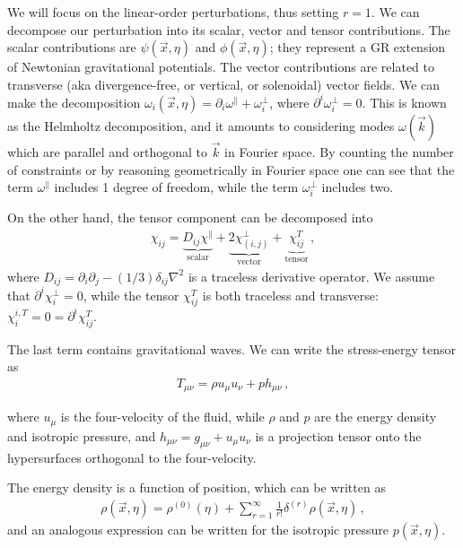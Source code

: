 \documentclass[main.tex]{subfiles}
\begin{document}

We will focus on the linear-order perturbations, thus setting \(r = 1\).
We can decompose our perturbation into its scalar, vector and tensor contributions. 
The scalar contributions are \(\psi (\vec{x}, \eta )\) and \(\phi (\vec{x}, \eta )\); they represent a GR extension of Newtonian gravitational potentials. 
The vector contributions are related to transverse (aka divergence-free, or vertical, or solenoidal) vector fields.
We can make the decomposition \(\omega _i (\vec{x}, \eta ) = \partial_i \omega^{\parallel} + \omega _i^{\perp}\), where \(\partial^{i} \omega _i^{\perp} = 0\). This is known as the Helmholtz decomposition, and it amounts to considering modes \(\omega (\vec{k})\) which are parallel and orthogonal to \(\vec{k}\) in Fourier space.
By counting the number of constraints or by reasoning geometrically in Fourier space one can see that the term \(\omega^{\parallel}\) includes 1 degree of freedom, while the term \(\omega^{\perp}_i\) includes two.

On the other hand, the tensor component can be decomposed into 
%
\begin{align}
\chi_{ij} = \underbrace{D_{ij} \chi^{\parallel}}_{\text{scalar}} + \underbrace{2 \chi^{\perp}_{(i, j)}}_{\text{vector}} + \underbrace{\chi_{ij}^{T}}_{\text{tensor}}
\,,
\end{align}
%
where \(D_{ij} = \partial_i \partial_{j} - (1/3) \delta_{ij} \nabla^2\) is a traceless derivative operator.
We assume that \(\partial^{i} \chi_{i}^{\perp} = 0\), while the tensor \(\chi_{ij}^{T}\) is both traceless and transverse: \(\chi_{i}^{i, T} = 0 = \partial^{i} \chi_{ij}^{T}\).

The last term contains gravitational waves. 
We can write the stress-energy tensor as 
%
\begin{align}
T_{\mu \nu } = \rho u_\mu u_\nu + p h_{\mu \nu  }
\,,
\end{align}

where \(u_\mu \) is the four-velocity of the fluid, while \(\rho \) and \(p\) are the energy density and isotropic pressure, and \(h_{\mu \nu } = g_{\mu \nu} + u_\mu u_\nu \) is a projection tensor onto the hypersurfaces orthogonal to the four-velocity.

The energy density is a function of position, which can be written as 
%
\begin{align}
\rho (\vec{x}, \eta ) = \rho^{(0)}(\eta ) + \sum _{r=1}^{\infty } \frac{1}{r!} \delta^{(r)} \rho (\vec{x}, \eta )
\,,
\end{align}
%
and an analogous expression can be written for the isotropic pressure \(p(\vec{x}, \eta )\). 
\end{document}
